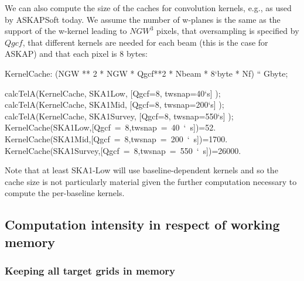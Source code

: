 \documentclass[useAMS,usenatbib,referee]{article}
\begin{document}
We can also compute the size of the caches for convolution kernels,
e.g., as used by ASKAPSoft today. We assume the number of w-planes is
the same as the support of the w-kernel leading to $NGW^3$ pixels,
that oversampling is specified by $Qgcf$, that different kernels are
needed for each beam (this is the case for ASKAP) and that each pixel
is 8 bytes:
\begin{maxima}[]
KernelCache: (NGW ** 2 * NGW * Qgcf**2 * Nbeam * 8`byte * Nf) `` Gbyte;

calcTelA(KernelCache, SKA1Low,  [Qgcf=8, twsnap=40`s] );
calcTelA(KernelCache, SKA1Mid,  [Qgcf=8, twsnap=200`s] );
calcTelA(KernelCache, SKA1Survey,  [Qgcf=8, twsnap=550`s] );
\maximaoutput*
{}\; \\
\m  \mbox{{}KernelCache(SKA1Low,[Qgcf = 8,twsnap = 40 ` s]){}}=52. \\
\m  \mbox{{}KernelCache(SKA1Mid,[Qgcf = 8,twsnap = 200 ` s]){}}=1700. \\
\m  \mbox{{}KernelCache(SKA1Survey,[Qgcf = 8,twsnap = 550 ` s]){}}=26000. \\
\end{maxima}
Note that at least SKA1-Low will use baseline-dependent kernels and so
the cache size is not particularly material given the further
computation necessary to compute the per-baseline kernels.

\subsection{Computation intensity in respect of working memory}

\subsubsection{Keeping all target grids in memory}
\end{document}
